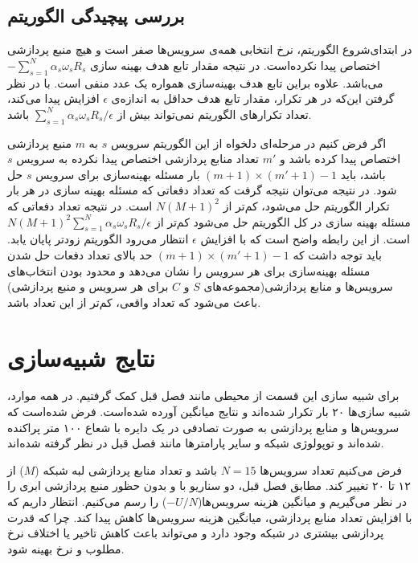    \subsection{بررسی پیچیدگی الگوریتم}
      در ابتدای‌شروع الگوریتم، نرخ انتخابی همه‌ی سرویس‌ها صفر است و هیچ منبع پردازشی اختصاص پیدا نکرده‌است.
      در نتیجه مقدار تابع هدف بهینه سازی $-\sum_{s=1}^N \alpha_s \omega_s R_s$ می‌باشد.
      علاوه براین تابع هدف بهینه‌سازی همواره یک عدد منفی است.
      با در نظر گرفتن این‌که در هر تکرار، مقدار تابع هدف حداقل به اندازه‌ی $\epsilon$ افزایش پیدا می‌کند، تعداد تکرار‌های الگوریتم نمی‌تواند بیش از $\sum_{s=1}^N  \alpha_s \omega_s R_s / \epsilon$  باشد.
      
      اگر فرض کنیم در مرحله‌ای دلخواه از این الگوریتم سرویس $s$ به $m$ منبع پردازشی اختصاص پیدا کرده باشد و $m'$ تعداد منابع پردازشی اختصاص پیدا نکرده به سرویس $s$ باشد، باید $(m+1) \times (m'+1) - 1$ بار مسئله بهینه‌سازی برای سرویس $s$ حل شود.
      در نتیجه می‌توان نتیجه گرفت که تعداد دفعاتی که مسئله بهینه سازی در هر بار تکرار الگوریتم حل می‌شود، کم‌تر از $N(M+1)^2$ است.
      در نتیجه تعداد دفعاتی که مسئله بهینه سازی در کل الگوریتم حل می‌شود کم‌تر از $N(M+1)^2 \sum_{s=1}^N  \alpha_s \omega_s R_s / \epsilon$ است.
      از این رابطه واضح است که با افزایش $\epsilon$ انتظار می‌رود الگوریتم زود‌تر پایان یابد.
      باید توجه داشت که $(m+1) \times (m'+1) - 1$ حد بالای تعداد دفعات حل شدن مسئله بهینه‌سازی برای هر سرویس را نشان می‌دهد و محدود بودن انتخاب‌های سرویس‌ها و منابع پردازشی(مجموعه‌های $S$ و $C$ برای هر سرویس و منبع پردازشی) باعث می‌شود که تعداد واقعی، کم‌تر از این تعداد باشد.

  \section{نتایج شبیه‌سازی}
    برای شبیه سازی این قسمت از محیطی مانند فصل قبل کمک گرفتیم.
    در همه موارد، شبیه سازی‌ها ۲۰ بار تکرار شده‌اند و نتایج میانگین آورده شده‌است.
    فرض شده‌است که سرویس‌ها و منابع پردازشی به صورت تصادفی در یک دایره با شعاع ۱۰۰ متر پراکنده شده‌اند و توپولوژی شبکه و سایر پارامتر‌ها مانند فصل قبل در نظر گرفته شده‌اند.
    
    فرض می‌کنیم تعداد سرویس‌ها $N=15$ باشد و تعداد منابع پردازشی لبه شبکه ($M$) از ۱۲ تا ۲۰ تغییر کند.
    مطابق فصل قبل، دو سناریو با و بدون حظور منبع پردازشی ابری را در نظر می‌گیریم و میانگین هزینه سرویس‌ها($-U/N$) را رسم می‌کنیم.
    انتظار داریم که با افزایش تعداد منابع پردازشی، میانگین هزینه سرویس‌ها کاهش پیدا کند. چرا که قدرت پردازشی بیشتری در شبکه وجود دارد و می‌تواند باعث کاهش تاخیر یا اختلاف نرخ مطلوب و نرخ بهینه شود.


